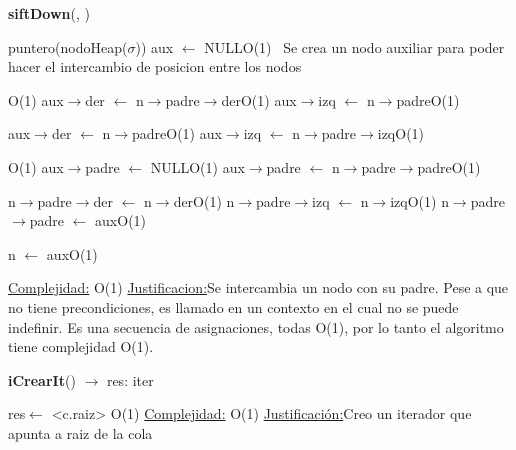 \begin{Representacion}
\begin{Algoritmos}
\begin{algorithm}[H]{\textbf{siftDown}(, )}
	\begin{algorithmic}[1]
		
		\State puntero(nodoHeap($\sigma$)) aux $\leftarrow$ NULL\Comment O(1) $\,$
		\Comment Se crea un nodo auxiliar para poder hacer el intercambio de posicion entre los nodos
		
		\Comment O(1)
			\State aux$\rightarrow$der $\leftarrow$ n$\rightarrow$padre$\rightarrow$der\Comment O(1)
			\State aux$\rightarrow$izq $\leftarrow$ n$\rightarrow$padre\Comment O(1)
			
		\Else
			\State aux$\rightarrow$der $\leftarrow$ n$\rightarrow$padre\Comment O(1)
			\State aux$\rightarrow$izq $\leftarrow$ n$\rightarrow$padre$\rightarrow$izq\Comment O(1)
		\EndIf
				
			
			
		\Comment O(1)
			\State aux$\rightarrow$padre $\leftarrow$ NULL\Comment O(1)
		\Else
			\State aux$\rightarrow$padre $\leftarrow$ n$\rightarrow$padre$\rightarrow$padre\Comment O(1)
		\EndIf
		
		\State n$\rightarrow$padre$\rightarrow$der $\leftarrow$ n$\rightarrow$der\Comment O(1)
		\State n$\rightarrow$padre$\rightarrow$izq $\leftarrow$ n$\rightarrow$izq\Comment O(1)
		\State n$\rightarrow$padre$\rightarrow$padre $\leftarrow$ aux\Comment O(1)
		
		\State n $\leftarrow$ aux\Comment O(1)
		
		\medskip
		\Statex \underline{Complejidad:} O(1)
			\Statex \underline{Justificacion:}Se intercambia un nodo con su padre. Pese a que no tiene precondiciones, es llamado en un contexto en el cual no se puede indefinir. Es una secuencia de asignaciones, todas O(1), por lo tanto el algoritmo tiene complejidad O(1). 
	\end{algorithmic}
\end{algorithm}


\begin{algorithm}[H]{\textbf{iCrearIt}() $\to$ res: iter}
	\begin{algorithmic}[1]
		\State res$\gets$ <c.raiz> \Comment O(1)
		\medskip
		\Statex \underline{Complejidad:} O(1)
			\Statex \underline{Justificación:}Creo un iterador que apunta a raiz de la cola
	\end{algorithmic}
\end{algorithm}


\end{Algoritmos}
\end{Representacion}
